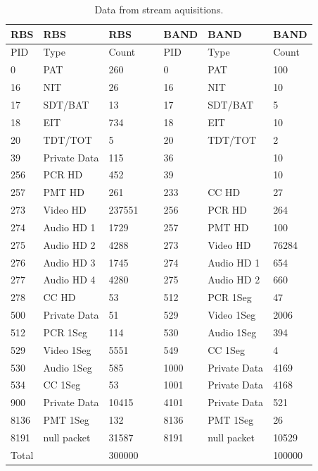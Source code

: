 \documentclass[
	12pt,				%
	openright,			%
	twoside,			%
	a4paper,			%
	brazil,
	french,				%
	english
	]{abntex2}
\begin{document}
\begin{table}[!hb]
\centering
    \caption {Data from stream aquisitions.}
    \begin{tabular}{|l|l|l|l|l|l|l|}
    \hline
     RBS  & RBS          & RBS    & ~ & BAND & BAND         & BAND   \\ \hline
    PID   & Type         & Count  & ~ & PID  & Type         & Count  \\ \hline
    0     & PAT          & 260    & ~ & 0    & PAT          & 100    \\ \hline
    16    & NIT          & 26     & ~ & 16   & NIT          & 10     \\ \hline
    17    & SDT/BAT      & 13     & ~ & 17   & SDT/BAT      & 5      \\ \hline
    18    & EIT          & 734    & ~ & 18   & EIT          & 10     \\ \hline
    20    & TDT/TOT      & 5      & ~ & 20   & TDT/TOT      & 2      \\ \hline
    39    & Private Data & 115    & ~ & 36   & ~            & 10     \\ \hline
    256   & PCR HD       & 452    & ~ & 39   & ~            & 10     \\ \hline
    257   & PMT HD       & 261    & ~ & 233  & CC HD        & 27     \\ \hline
    273   & Video HD     & 237551 & ~ & 256  & PCR HD       & 264    \\ \hline
    274   & Audio HD 1   & 1729   & ~ & 257  & PMT HD       & 100    \\ \hline
    275   & Audio HD 2   & 4288   & ~ & 273  & Video HD     & 76284  \\ \hline
    276   & Audio HD 3   & 1745   & ~ & 274  & Audio HD 1   & 654    \\ \hline
    277   & Audio HD 4   & 4280   & ~ & 275  & Audio HD 2   & 660    \\ \hline
    278   & CC HD        & 53     & ~ & 512  & PCR 1Seg     & 47     \\ \hline
    500   & Private Data & 51     & ~ & 529  & Video 1Seg   & 2006   \\ \hline
    512   & PCR 1Seg     & 114    & ~ & 530  & Audio 1Seg   & 394    \\ \hline
    529   & Video 1Seg   & 5551   & ~ & 549  & CC 1Seg      & 4      \\ \hline
    530   & Audio 1Seg   & 585    & ~ & 1000 & Private Data & 4169   \\ \hline
    534   & CC 1Seg      & 53     & ~ & 1001 & Private Data & 4168   \\ \hline
    900   & Private Data & 10415  & ~ & 4101 & Private Data & 521    \\ \hline
    8136  & PMT 1Seg     & 132    & ~ & 8136 & PMT 1Seg     & 26     \\ \hline
    8191  & null packet  & 31587  & ~ & 8191 & null packet  & 10529  \\ \hline
    Total & ~            & 300000 & ~ & ~    & ~            & 100000 \\ \hline
    \end{tabular}
	\label{tab_dumps}
\end{table}
\end{document}

